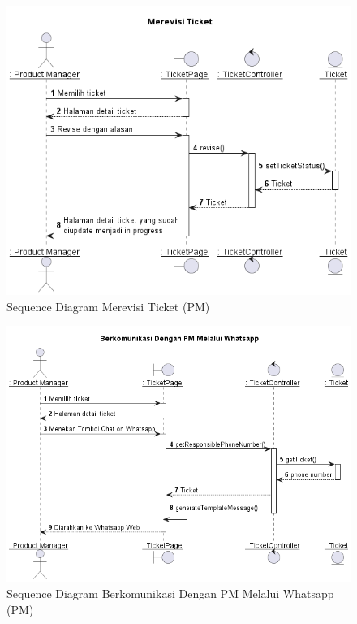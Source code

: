 \documentclass[12pt]{article}
\begin{document}
\begin{enumerate}[label=\textbf{4.\arabic*.}]
\begin{enumerate} [label=\textbf{4.2.\arabic*.}, wide, labelwidth=!, labelindent=0pt]
\begin{enumerate}[label=\textbf{4.2.2.\arabic*.}, wide, labelwidth=!, labelindent=0pt]
\begin{enumerate}[label=\arabic*.]
                \begin{figure}
                    \centering \includegraphics[height=0.575\textheight]{out/plantuml/sequence/ipm/ipm6/Merevisi Ticket.png}
                    \caption{Sequence Diagram Merevisi Ticket (PM)}
                    \label{fig:SQ-PM-06}
                \end{figure}

                \begin{figure}
                    \centering \includegraphics[height=0.575\textheight]{out/plantuml/sequence/ipm/ipm7/Berkomunikasi Dengan PM Melalui Whatsapp.png}
                    \caption{Sequence Diagram Berkomunikasi Dengan PM Melalui Whatsapp (PM)}
                    \label{fig:SQ-PM-07}
                \end{figure}


\end{enumerate}
\end{enumerate}
\end{enumerate}
\end{enumerate}
\end{document}
